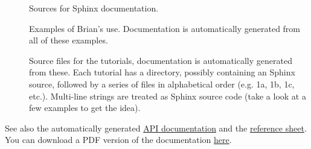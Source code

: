 \documentclass[letterpaper,10pt,english]{manual}
\begin{document}
\begin{description}
\item[]
Sources for Sphinx documentation.

\item[]
Examples of Brian's use. Documentation is automatically generated from all
of these examples.

\item[]
Source files for the tutorials, documentation is automatically generated
from these. Each tutorial has a directory, possibly containing an
 Sphinx source, followed by a series of files in
alphabetical order (e.g. 1a, 1b, 1c, etc.). Multi-line strings are treated
as Sphinx source code (take a look at a few examples to get the idea).

\end{description}

See also the automatically generated \href{http://brian.di.ens.fr/docs/api/}{API documentation} and
the \href{http://brian.di.ens.fr//BrianReference.pdf}{reference sheet}. You can download a PDF
version of the documentation \href{http://brian.di.ens.fr/docs/Brian.pdf}{here}.


\renewcommand{\indexname}{Module Index}
\printmodindex
\renewcommand{\indexname}{Index}
\printindex
\end{document}
